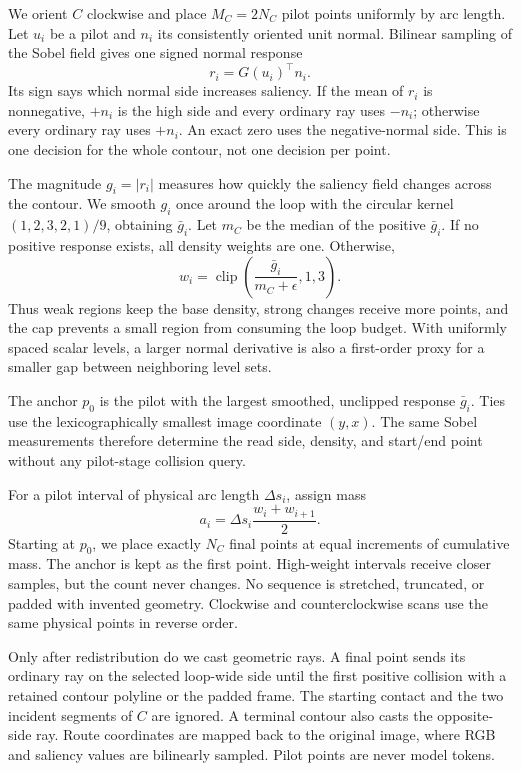 We orient $C$ clockwise and place $M_C=2N_C$ pilot points uniformly by arc length. Let $u_i$ be a pilot and $n_i$ its consistently oriented unit normal. Bilinear sampling of the Sobel field gives one signed normal response
\begin{equation}
r_i=G(u_i)^{\top}n_i.
\label{eq:sobel-response}
\end{equation}
Its sign says which normal side increases saliency. If the mean of $r_i$ is nonnegative, $+n_i$ is the high side and every ordinary ray uses $-n_i$; otherwise every ordinary ray uses $+n_i$. An exact zero uses the negative-normal side. This is one decision for the whole contour, not one decision per point.

The magnitude $g_i=|r_i|$ measures how quickly the saliency field changes across the contour. We smooth $g_i$ once around the loop with the circular kernel $(1,2,3,2,1)/9$, obtaining $\bar g_i$. Let $m_C$ be the median of the positive $\bar g_i$. If no positive response exists, all density weights are one. Otherwise,
\begin{equation}
w_i=\operatorname{clip}\!\left(\frac{\bar g_i}{m_C+\epsilon},1,3\right).
\label{eq:density}
\end{equation}
Thus weak regions keep the base density, strong changes receive more points, and the cap prevents a small region from consuming the loop budget. With uniformly spaced scalar levels, a larger normal derivative is also a first-order proxy for a smaller gap between neighboring level sets.

The anchor $p_0$ is the pilot with the largest smoothed, unclipped response $\bar g_i$. Ties use the lexicographically smallest image coordinate $(y,x)$. The same Sobel measurements therefore determine the read side, density, and start/end point without any pilot-stage collision query.

For a pilot interval of physical arc length $\Delta s_i$, assign mass
\begin{equation}
a_i=\Delta s_i\frac{w_i+w_{i+1}}{2}.
\end{equation}
Starting at $p_0$, we place exactly $N_C$ final points at equal increments of cumulative mass. The anchor is kept as the first point. High-weight intervals receive closer samples, but the count never changes. No sequence is stretched, truncated, or padded with invented geometry. Clockwise and counterclockwise scans use the same physical points in reverse order.

Only after redistribution do we cast geometric rays. A final point sends its ordinary ray on the selected loop-wide side until the first positive collision with a retained contour polyline or the padded frame. The starting contact and the two incident segments of $C$ are ignored. A terminal contour also casts the opposite-side ray. Route coordinates are mapped back to the original image, where RGB and saliency values are bilinearly sampled. Pilot points are never model tokens.

